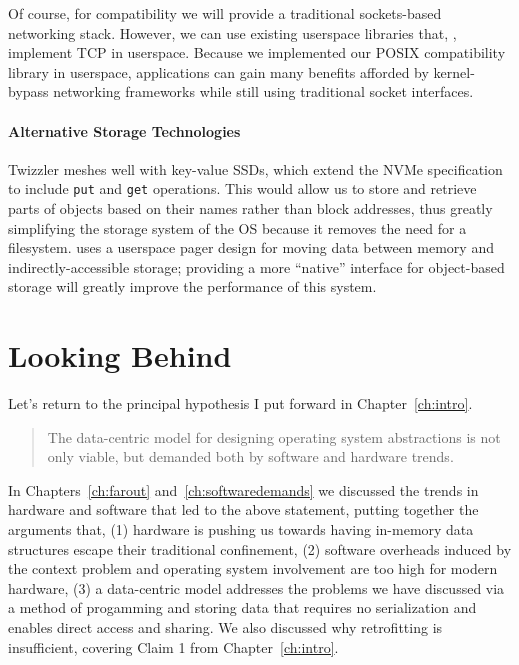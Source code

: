     Of course, for compatibility we will provide a traditional sockets-based networking stack. However,
    we can use existing userspace libraries that, \eg, implement TCP in userspace.
    Because we implemented our POSIX compatibility library in userspace, applications can gain many
    benefits afforded by kernel-bypass networking frameworks while still using traditional socket
    interfaces.

\fi

\paragraph{Alternative Storage Technologies}

Twizzler meshes well with key-value SSDs, which extend the NVMe
specification to include \texttt{put} and \texttt{get} operations. This would allow us to store and
retrieve parts of objects based on their names rather than block addresses, thus greatly
simplifying the storage system of the OS because it removes the need for a filesystem. \Twizzler
uses a userspace pager design for moving data between memory and indirectly-accessible storage;
providing a more ``native'' interface for object-based storage will greatly improve the performance
of this system.



\clearpage
\section{Looking Behind}


Let's return to the principal hypothesis I put forward in Chapter~\ref{ch:intro}.

\begin{quotation}
    \noindent The data-centric model
    for designing operating system abstractions is not only viable, but demanded both by software and hardware trends.
\end{quotation}

In Chapters~\ref{ch:farout} and~\ref{ch:softwaredemands} we discussed the trends in hardware and software that led to
the above statement, putting together the arguments that, (1) hardware is pushing us towards having in-memory
data structures escape their traditional confinement, (2) software overheads induced by the context problem and
operating system involvement are too high for modern hardware, (3) a data-centric model addresses the problems we have
discussed via a method of progamming and storing data that requires no serialization and enables direct access and
sharing. We also discussed why retrofitting is insufficient, covering Claim 1 from Chapter~\ref{ch:intro}.

